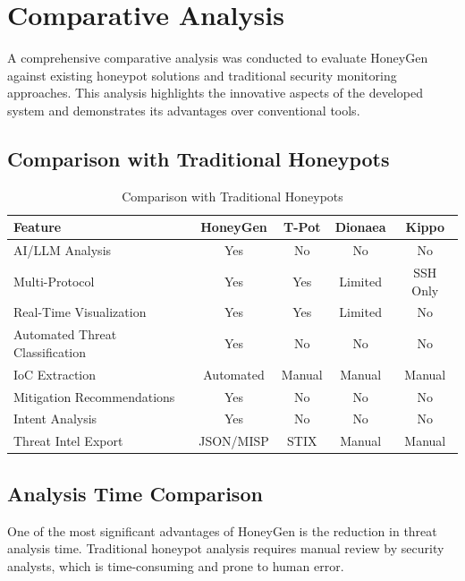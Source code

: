 \documentclass[12pt,a4paper]{report}
\begin{document}
\section{Comparative Analysis}

A comprehensive comparative analysis was conducted to evaluate HoneyGen against existing honeypot solutions and traditional security monitoring approaches. This analysis highlights the innovative aspects of the developed system and demonstrates its advantages over conventional tools.

\subsection{Comparison with Traditional Honeypots}

\begin{table}[h]
\centering
\caption{Comparison with Traditional Honeypots}
\label{tab:comparison}
\begin{tabular}{|l|c|c|c|c|}
\hline
\textbf{Feature} & \textbf{HoneyGen} & \textbf{T-Pot} & \textbf{Dionaea} & \textbf{Kippo} \\
\hline
AI/LLM Analysis & Yes & No & No & No \\
\hline
Multi-Protocol & Yes & Yes & Limited & SSH Only \\
\hline
Real-Time Visualization & Yes & Yes & Limited & No \\
\hline
Automated Threat Classification & Yes & No & No & No \\
\hline
IoC Extraction & Automated & Manual & Manual & Manual \\
\hline
Mitigation Recommendations & Yes & No & No & No \\
\hline
Intent Analysis & Yes & No & No & No \\
\hline
Threat Intel Export & JSON/MISP & STIX & Manual & Manual \\
\hline
\end{tabular}
\end{table}

\subsection{Analysis Time Comparison}

One of the most significant advantages of HoneyGen is the reduction in threat analysis time. Traditional honeypot analysis requires manual review by security analysts, which is time-consuming and prone to human error.
\end{document}
